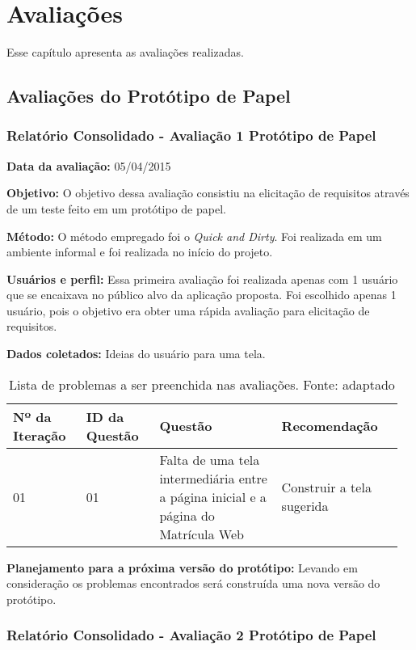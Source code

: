 \chapter{Avaliações}
Esse capítulo apresenta as avaliações realizadas.

\section{Avaliações do Protótipo de Papel}

\subsection{Relatório Consolidado - Avaliação 1 Protótipo de Papel}

\textbf{Data da avaliação:} 05/04/2015

\textbf{Objetivo:}
O objetivo dessa avaliação consistiu na elicitação de requisitos através de um teste feito em um protótipo de papel.

\textbf{Método:}
O método empregado foi o \textit{Quick and Dirty}\cite{preece}. Foi realizada em um ambiente informal e foi realizada no início do projeto.

\textbf{Usuários e perfil:}
Essa primeira avaliação foi realizada apenas com 1 usuário que se encaixava no público alvo da aplicação proposta. Foi escolhido apenas 1 usuário, pois o objetivo era obter uma rápida avaliação para elicitação de requisitos.

\textbf{Dados coletados:}
Ideias do usuário para uma tela.

\begin{table*}[!h]
\caption{Lista de problemas a ser preenchida nas avaliações. Fonte: \cite{preece} adaptado}
\label{tab:problema}
  \begin{tabular}{p{0.18\linewidth}p{0.18\linewidth}p{0.30\linewidth}p{0.30\linewidth}}
  \hline
    Nº da Iteração & ID da Questão & Questão & Recomendação\\
 \hline
    01 & 01 & Falta de uma tela intermediária entre a página inicial e a página do Matrícula Web & Construir a tela sugerida\\
  \end{tabular}
\end{table*}

\textbf{Planejamento para a próxima versão do protótipo:}
Levando em consideração os problemas encontrados será construída uma nova versão do protótipo. 
\vfill
\pagebreak

\subsection{Relatório Consolidado - Avaliação 2 Protótipo de Papel}

